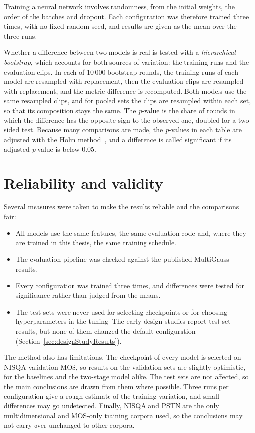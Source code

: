 \documentclass[
english,                 %
bibtex,                  %
includeExtraAbstracts, %
]{kththesis}
\numberwithin{listing}{chapter}
\begin{document}
Training a neural network involves randomness, from the initial weights, the order of the batches and dropout. Each configuration was therefore trained three times, with no fixed random seed, and results are given as the mean over the three runs.

Whether a difference between two models is real is tested with a \emph{hierarchical bootstrap}, which accounts for both sources of variation: the training runs and the evaluation clips. In each of 10\,000 bootstrap rounds, the training runs of each model are resampled with replacement, then the evaluation clips are resampled with replacement, and the metric difference is recomputed. Both models use the same resampled clips, and for pooled sets the clips are resampled within each set, so that its composition stays the same. The \emph{p}-value is the share of rounds in which the difference has the opposite sign to the observed one, doubled for a two-sided test. Because many comparisons are made, the \emph{p}-values in each table are adjusted with the Holm method~\cite{holm_1979}, and a difference is called significant if its adjusted \emph{p}-value is below 0.05.

\section{Reliability and validity}
\label{sec:reliabilityValidity}

Several measures were taken to make the results reliable and the comparisons fair:
\begin{itemize}
\item All models use the same features, the same evaluation code and, where they are trained in this thesis, the same training schedule.
\item The evaluation pipeline was checked against the published MultiGauss results.
\item Every configuration was trained three times, and differences were tested for significance rather than judged from the means.
\item The test sets were never used for selecting checkpoints or for choosing hyperparameters in the tuning. The early design studies report test-set results, but none of them changed the default configuration (Section~\ref{sec:designStudyResults}).
\end{itemize}

The method also has limitations. The checkpoint of every model is selected on NISQA validation MOS, so results on the validation sets are slightly optimistic, for the baselines and the two-stage model alike. The test sets are not affected, so the main conclusions are drawn from them where possible. Three runs per configuration give a rough estimate of the training variation, and small differences may go undetected. Finally, NISQA and PSTN are the only multidimensional and MOS-only training corpora used, so the conclusions may not carry over unchanged to other corpora.
\end{document}
